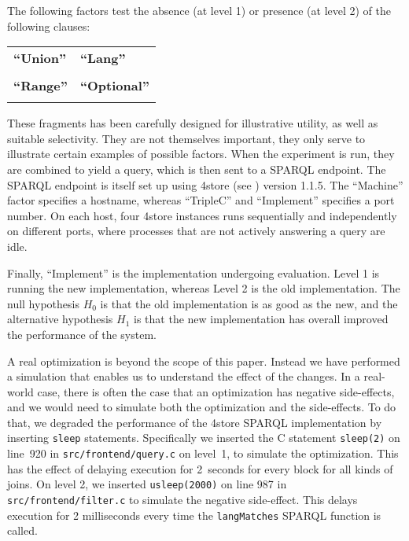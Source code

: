 \documentclass{llncs}
\begin{document}
The following factors test the absence (at level 1) or presence (at
level 2) of the following clauses:

\begin{center}\small
  \begin{tabular}{|@{~~}p{}|@{~~}p{}|}
    \hline
    \textbf{``Union''} & \textbf{``Lang''} \\[-2ex]
     &
     \\
    \hline
    \textbf{``Range''} & \textbf{``Optional''} \\[-2ex]
     & 
    \\
    \hline
  \end{tabular}
\end{center}
These fragments has been carefully designed for illustrative utility,
as well as suitable selectivity. They are not themselves important,
they only serve to illustrate certain examples of possible
factors. When the experiment is run, they are combined to yield a
query, which is then sent to a SPARQL endpoint. The SPARQL endpoint is
itself set up using 4store (see \cite{harris20094store}) version
1.1.5. The ``Machine'' factor specifies a hostname, whereas
``TripleC'' and ``Implement'' specifies a port number. On each host,
four 4store instances runs sequentially and independently on different
ports, where processes that are not actively answering a query are
idle.


Finally, ``Implement'' is the implementation undergoing
evaluation. Level 1 is running the new implementation, whereas Level 2
is the old implementation. The null hypothesis $H_0$ is that the old
implementation is as good as the new, and the alternative hypothesis
$H_1$ is that the new implementation has overall improved the
performance of the system.

A real optimization is beyond the scope of this paper. Instead we have
performed a simulation that enables us to understand the effect of the
changes.  In a real-world case, there is often the case that an
optimization has negative side-effects, and we would need to simulate
both the optimization and the side-effects. To do that, we degraded
the performance of the 4store SPARQL implementation by inserting
\texttt{sleep} statements. Specifically we inserted the C statement
\texttt{sleep(2)} on line~920 in \texttt{src/frontend/query.c} on
level~1, to simulate the optimization. This has the effect of delaying
execution for 2~seconds for every block for all kinds of joins. On
level 2, we inserted \texttt{usleep(2000)} on line 987 in
\texttt{src/frontend/filter.c} to simulate the negative
side-effect. This delays execution for 2 milliseconds every time the
\texttt{langMatches} SPARQL function is called.
\end{document}
